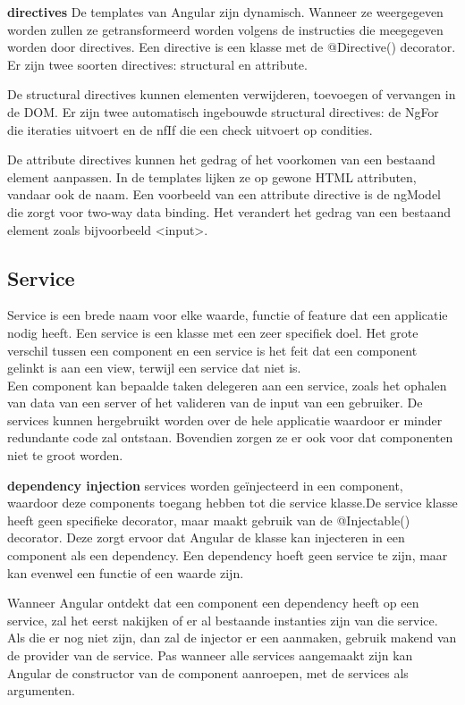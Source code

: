 \textbf{directives} \hspace{1cm} De templates van Angular zijn dynamisch. Wanneer ze weergegeven worden zullen ze getransformeerd worden volgens de instructies die meegegeven worden door directives. Een directive is een klasse met de @Directive() decorator. Er zijn twee soorten directives: structural en attribute. 

De structural directives kunnen elementen verwijderen, toevoegen of vervangen in de DOM. Er zijn twee automatisch ingebouwde structural directives: de NgFor die iteraties uitvoert en de nfIf die een check uitvoert op condities.

De attribute directives kunnen het gedrag of het voorkomen van een bestaand element aanpassen. In de templates lijken ze op gewone HTML attributen, vandaar ook de naam. 
Een voorbeeld van een attribute directive is de ngModel die zorgt voor two-way data binding. Het verandert het gedrag van een bestaand element zoals bijvoorbeeld <input>. 

\subsection{Service}
Service is een brede naam voor elke waarde, functie of feature dat een applicatie nodig heeft. Een service is een klasse met een zeer specifiek doel. Het grote verschil tussen een component en een service is het feit dat een component gelinkt is aan een view, terwijl een service dat niet is. \\
Een component kan bepaalde taken delegeren aan een service, zoals het ophalen van data van een server of het valideren van de input van een gebruiker. De services kunnen hergebruikt worden over de hele applicatie waardoor er minder redundante code zal ontstaan. Bovendien zorgen ze er ook voor dat componenten niet te groot worden. 

\textbf{dependency injection} \hspace{1cm} services worden geïnjecteerd in een component, waardoor deze components toegang hebben tot die service klasse.De service klasse heeft geen specifieke decorator, maar maakt gebruik van de @Injectable() decorator. Deze zorgt ervoor dat Angular de klasse kan injecteren in een component als een dependency. Een dependency hoeft geen service te zijn, maar kan evenwel een functie of een waarde zijn. 

Wanneer Angular ontdekt dat een component een dependency heeft op een service, zal het eerst nakijken of er al bestaande instanties zijn van die service. Als die er nog niet zijn, dan zal de injector er een aanmaken, gebruik makend van de provider van de service. Pas wanneer alle services aangemaakt zijn kan Angular de constructor van de component aanroepen, met de services als argumenten. 

